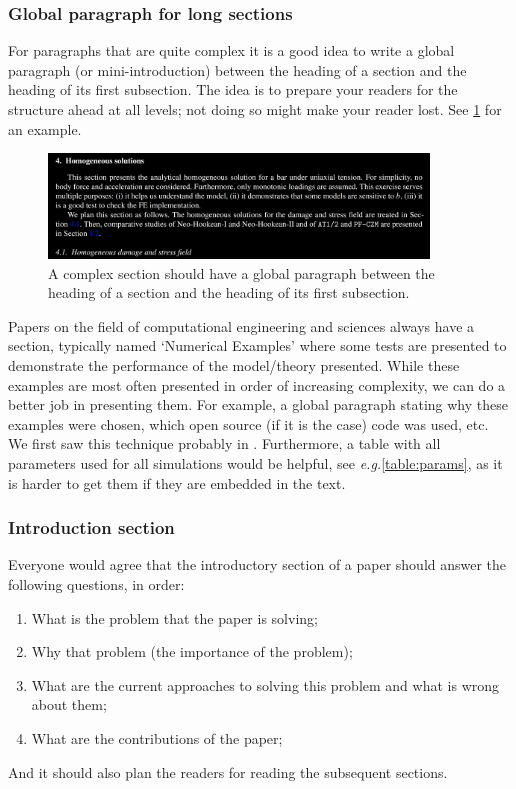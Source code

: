 \documentclass[authoryear,12pta4paper,fleqn]{article}
\newcommand{\eg}{\textit{e.g.}\xspace}
\numberwithin{equation}{section}
\theoremstyle{remark}
\begin{document}
\subsubsection{Global paragraph for long sections}\label{sec:global-para}

For paragraphs that are quite complex it is a good idea to write a global paragraph (or mini-introduction) between the heading of a section and the heading of its first subsection. The idea is  to prepare your readers for the structure ahead at all levels; not doing so might make your reader lost. See \cref{fig:section} for an example. 


\begin{figure}[!h]
  \centering
  \includegraphics[width=0.9\textwidth]{section}
  \caption{A complex section should have a global paragraph between the heading of a section and the heading of its first subsection.}
  \label{fig:section}
\end{figure}


Papers on the field of computational engineering and sciences always have a section, typically named `Numerical Examples' where some tests are presented to demonstrate the performance of the model/theory presented. While these examples are most often presented in order of increasing complexity, we can do a better job in presenting them. For example, a global paragraph stating why these examples were chosen, which open source (if it is the case) code was used, etc. We first saw this technique probably in \cite{huang2003modeling}. Furthermore, a table with all parameters used for all simulations would be helpful, see \eg \cref{table:params}, as it is harder to get them if they are embedded in the text.

\subsubsection{Introduction section}\label{sec:introduction-part}

Everyone would agree that the introductory section of a paper should answer the following questions, in order:

\begin{enumerate}
\item What is the problem that the paper is solving;
\item Why that problem (the importance of the problem);
\item What are the current approaches to solving this problem and what is wrong about them;
\item What are the contributions of the paper; 
\end{enumerate}
And it should also plan  the readers for reading the subsequent sections.
\end{document}
